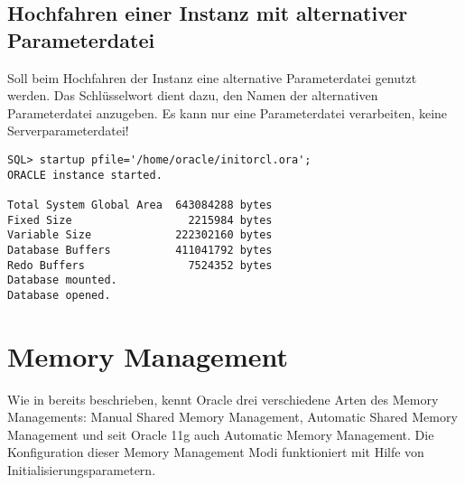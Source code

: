       \subsection{Hochfahren einer Instanz mit alternativer Parameterdatei}
        Soll beim Hochfahren der Instanz eine alternative Parameterdatei genutzt werden.          Das Schl\"usselwort  dient dazu, den Namen der alternativen Parameterdatei anzugeben. Es kann nur eine Parameterdatei verarbeiten, keine Serverparameterdatei!
        \begin{lstlisting}[caption={Start mit alternativer Parameterdatei},label=admin21,language=sqlplus]
SQL> startup pfile='/home/oracle/initorcl.ora';
ORACLE instance started.

Total System Global Area  643084288 bytes
Fixed Size                  2215984 bytes
Variable Size             222302160 bytes
Database Buffers          411041792 bytes
Redo Buffers                7524352 bytes
Database mounted.
Database opened.
        \end{lstlisting}
        \begin{literaturinternet}
          \item \cite{i1006091}
        \end{literaturinternet}

    \section{Memory Management}
      Wie in  bereits beschrieben, kennt Oracle drei verschiedene Arten des Memory Managements: Manual Shared Memory Management, Automatic Shared Memory Management und seit Oracle 11g auch Automatic Memory Management. Die Konfiguration dieser Memory Management Modi funktioniert mit Hilfe von Initialisierungsparametern.
